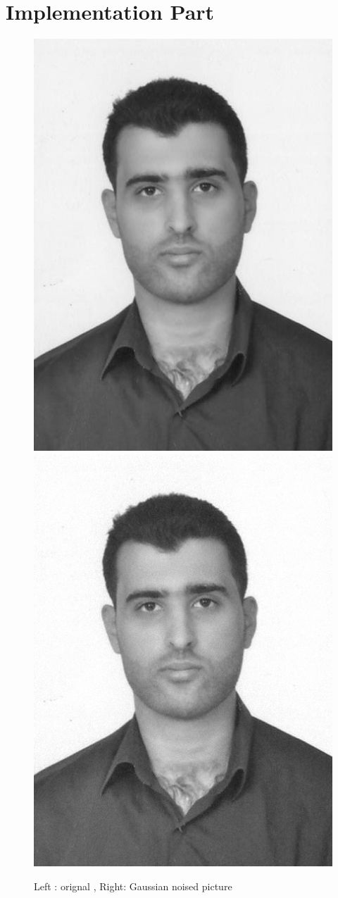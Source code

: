 \documentclass{article}
\begin{document}
\section{Implementation Part}
\begin{figure}[H]
	\includegraphics[scale=0.5]{mypicture.jpg}
	\includegraphics[scale=0.5]{mypic_noised.jpg}
	\caption{Left : orignal , Right: Gaussian noised picture}
\end{figure}
\end{document}
